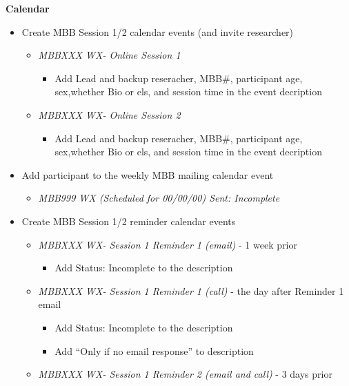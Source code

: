 \documentclass[]{book}
\providecommand{\tightlist}{%
  \setlength{\itemsep}{0pt}\setlength{\parskip}{0pt}}
\begin{document}
\textbf{Calendar}

\begin{itemize}
\tightlist
\item
  Create MBB Session 1/2 calendar events (and invite researcher)

  \begin{itemize}
  \tightlist
  \item
    \emph{MBBXXX WX- Online Session 1}

    \begin{itemize}
    \tightlist
    \item
      Add Lead and backup reseracher, MBB\#, participant age, sex,whether Bio or els, and session time in the event decription
    \end{itemize}
  \item
    \emph{MBBXXX WX- Online Session 2}

    \begin{itemize}
    \tightlist
    \item
      Add Lead and backup reseracher, MBB\#, participant age, sex,whether Bio or els, and session time in the event decription
    \end{itemize}
  \end{itemize}
\item
  Add participant to the weekly MBB mailing calendar event

  \begin{itemize}
  \tightlist
  \item
    \emph{MBB999 WX (Scheduled for 00/00/00) Sent: Incomplete}
  \end{itemize}
\item
  Create MBB Session 1/2 reminder calendar events

  \begin{itemize}
  \tightlist
  \item
    \emph{MBBXXX WX- Session 1 Reminder 1 (email)} - 1 week prior

    \begin{itemize}
    \tightlist
    \item
      Add Status: Incomplete to the description
    \end{itemize}
  \item
    \emph{MBBXXX WX- Session 1 Reminder 1 (call)} - the day after Reminder 1 email

    \begin{itemize}
    \tightlist
    \item
      Add Status: Incomplete to the description
    \item
      Add ``Only if no email response'' to description
    \end{itemize}
  \item
    \emph{MBBXXX WX- Session 1 Reminder 2 (email and call)} - 3 days prior


\end{itemize}
\end{itemize}
\end{document}
